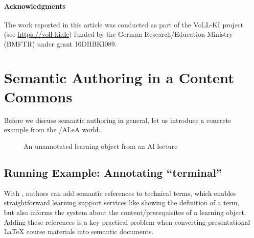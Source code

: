 \documentclass[runningheads]{llncs}
\newcommand\ALeA{\textsf{ALeA}\xspace}
\begin{document}
\paragraph{Acknowledgments}
The work reported in this article was conducted as part of the VoLL-KI project (see
\url{https://voll-ki.de}) funded by the German Research/Education Ministry (BMFTR) under
grant 16DHBKI089.

\section{Semantic Authoring in a Content Commons}\label{sec:semauth}

Before we discuss semantic authoring in general, let us introduce a concrete example from
the \sTeX/\ALeA world.

\begin{figure}\centering
  \caption{An unannotated learning object from an AI lecture}\label{fig:lo}
\end{figure}

\subsection{Running Example: Annotating ``terminal''}
With \sTeX, authors can add semantic references to technical terms,
which enables straightforward learning support services like
showing the definition of a term, but also informs the system
about the content/prerequisites of a learning object.
Adding these references is a key practical problem when converting presentational {\LaTeX}
course materials into semantic documents.
\end{document}
